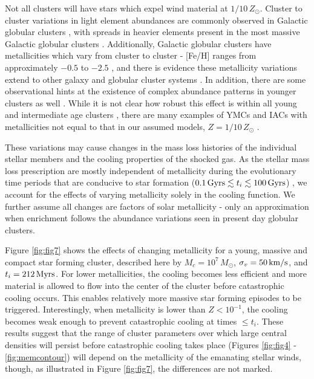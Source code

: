 \documentclass[fleqn,usenatbib]{mnras}
\begin{document}
Not all clusters will have stars which expel wind material at $1/10 \, Z_\odot$.
Cluster to cluster variations in light element abundances are commonly  observed in Galactic globular clusters  \citep{beasley,caldwell,gratton2004,carretta2010c,cohen2005,piotto2007}, with spreads in heavier elements present in the most massive Galactic globular clusters \citep{marino2009,carretta2009a,ferraro2009,carretta2010a,carretta2010c}.   Additionally, Galactic globular clusters have metallicities which vary from cluster to cluster -  [Fe/H] ranges from approximately $ -0.5$ to $ -2.5$ \citep{harris1996}, and there is evidence these metallicity variations extend to other galaxy and globular cluster systems \citep{usher2015}. 
In addition, there are some observational hints at the existence of complex abundance patterns in younger clusters as well \citep{li2016,martell2013}.  While it is not clear how robust this effect is within all young and intermediate age clusters \citep{mucc2008,mucc2014}, there are many examples of YMCs and IACs with metallicities not equal to that in our assumed models, $Z = 1/10 \, Z_\odot$ \citep{mucc2008}.

These variations may cause changes in the mass loss histories  of the individual stellar members and the cooling properties of the shocked gas. As the stellar mass loss prescription are mostly independent of metallicity during the evolutionary time periods that are conducive to star formation ($0.1 \, {\rm Gyrs} \lesssim t_{i} \lesssim 100 \, {\rm Gyrs}$) \citep{reimers1975,blocker}, we account for the effects of  varying metallicity solely in the  cooling function. We further assume all changes are factors of solar metallicity - only an approximation when enrichment follows the abundance variations seen in present day globular clusters.  

Figure \ref{fig:fig7} shows the effects of changing metallicity for a young, massive and compact star forming cluster, described here by 
$M_c = 10^7 \, M_\odot$, $\sigma_v = 50 \, {\rm km/s}$, 
and $t_{i} = 212 \, {\rm Myrs}$.   
For lower metallicities, the cooling becomes less efficient and  more material  is allowed to flow into the center of the cluster before catastrophic cooling occurs. This enables relatively more massive star forming episodes to be triggered.   Interestingly,  when metallicity is lower than $Z < 10^{-1}$, the cooling  becomes weak  enough to prevent  catastrophic cooling at times  $\leq t_{i}$.  
These results suggest that the range of cluster parameters  over which large central densities will persist before catastrophic cooling takes place (Figures \ref{fig:fig4} - \ref{fig:memcontour})  will depend  on the metallicity of the emanating stellar  winds, 
though,  as illustrated in Figure \ref{fig:fig7}, the differences are not marked.
\end{document}
